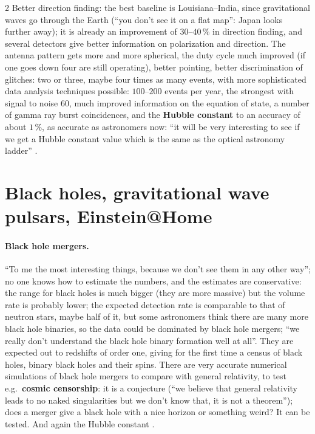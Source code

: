 \begin{paracol}{2}
Better direction finding: the best baseline is Louisiana--India, since gravitational waves go through the Earth (``you don't see it on a flat map'': Japan looks further away); it is already an improvement of $30$--$40\,\%$ in direction finding, and several detectors give better information on polarization and direction. The antenna pattern gets more and more spherical, the duty cycle much improved (if one goes down four are still operating), better pointing, better discrimination of glitches: two or three, maybe four times as many events, with more sophisticated data analysis techniques possible: $100$--$200$ events per year, the strongest with signal to noise $60$, much improved information on the equation of state, a number of gamma ray burst coincidences, and the \textbf{Hubble constant} to an accuracy of about $1\,\%$, as accurate as astronomers now: ``it will be very interesting to see if we get a Hubble constant value which is the same as the optical astronomy ladder'' .

\section{Black holes, gravitational wave pulsars, Einstein@Home}\label{sec:c27-bh}

\paragraph{Black hole mergers.} ``To me the most interesting things, because we don't see them in any other way''; no one knows how to estimate the numbers, and the estimates are conservative: the range for black holes is much bigger (they are more massive) but the volume rate is probably lower; the expected detection rate is comparable to that of neutron stars, maybe half of it, but some astronomers think there are many more black hole binaries, so the data could be dominated by black hole mergers; ``we really don't understand the black hole binary formation well at all''. They are expected out to redshifts of order one, giving for the first time a census of black holes, binary black holes and their spins. There are very accurate numerical simulations of black hole mergers to compare with general relativity, to test e.g.\ \textbf{cosmic censorship}: it is a conjecture (``we believe that general relativity leads to no naked singularities but we don't know that, it is not a theorem''); does a merger give a black hole with a nice horizon or something weird? It can be tested. And again the Hubble constant .


\end{paracol}
